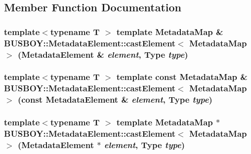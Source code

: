 \subsection{Member Function Documentation}
\hypertarget{classBUSBOY_1_1MetadataElement_a690ed8d331b145bbb8cbc2f545da9f8a}{
\subsubsection[{castElement}]{\setlength{\rightskip}{0pt plus 5cm}template$<$typename T $>$ template {\bf MetadataMap} \& BUSBOY::MetadataElement::castElement$<$ {\bf MetadataMap} $>$ ({\bf MetadataElement} \& {\em element}, \/  {\bf Type} {\em type})}}
\label{classBUSBOY_1_1MetadataElement_a690ed8d331b145bbb8cbc2f545da9f8a}
\hypertarget{classBUSBOY_1_1MetadataElement_ac5a43c0171daa27d6b6d21979a1dfcd5}{
\subsubsection[{castElement}]{\setlength{\rightskip}{0pt plus 5cm}template$<$typename T $>$ template const {\bf MetadataMap} \& BUSBOY::MetadataElement::castElement$<$ {\bf MetadataMap} $>$ (const {\bf MetadataElement} \& {\em element}, \/  {\bf Type} {\em type})}}
\label{classBUSBOY_1_1MetadataElement_ac5a43c0171daa27d6b6d21979a1dfcd5}
\hypertarget{classBUSBOY_1_1MetadataElement_ac99ac7b0cb21562de6f6b8384e9e1d50}{
\subsubsection[{castElement}]{\setlength{\rightskip}{0pt plus 5cm}template$<$typename T $>$ template {\bf MetadataMap} $\ast$ BUSBOY::MetadataElement::castElement$<$ {\bf MetadataMap} $>$ ({\bf MetadataElement} $\ast$ {\em element}, \/  {\bf Type} {\em type})}}
